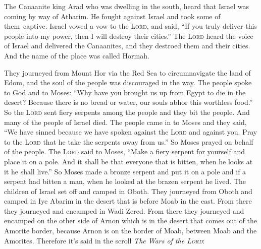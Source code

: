 
\begin{inparaenum}
     The Canaanite king Arad who was dwelling in the south, heard that Israel was coming by way of Atharim. He fought against Israel and took some of them\understood\ captive.%
     Israel vowed a vow to the \textsc{Lord}, and said, ``If you truly deliver this people into my power, then I will destroy their cities.''%
     The \textsc{Lord} heard the voice of Israel and delivered the Canaanites, and they destroed them and their cities. And the name of the place was called Hormah.%
    
     They journeyed from Mount Hor via the Red Sea to circumnavigate the land of Edom, and the soul of the people was discouraged in the way.%
     The people spoke to God and to Moses: ``Why have you brought us up from Egypt to die in the desert? Because there is no bread or water, our souls abhor this worthless food.''%
     So the \textsc{Lord} sent fiery serpents among the people and they bit the people. And many of the people of Israel died.%
     The people came in to Moses and they said, ``We have sinned because we have spoken against the \textsc{Lord} and against you. Pray to the \textsc{Lord} that he take the serpents away from us.'' So Moses prayed on behalf of the people.%
     The \textsc{Lord} said to Moses, ``Make a fiery serpent for yourself and place it on a pole. And it shall be that everyone that is bitten, when he looks at it he shall live.''%
     So Moses made a bronze serpent and put it on a pole and if a serpent had bitten a man, when he looked at the brazen serpent he lived.%
     The children of Israel set off and camped in Oboth.%
     They journeyed from Oboth and camped in Iye Abarim in the desert that is before Moab in the east.%
     From there they journeyed and encamped in Wadi Zered.%
     From there they journeyed and encamped on the other side of Arnon which is in the desert that comes out of the Amorite border, because Arnon is on the border of Moab, between Moab and the Amorites.%
     Therefore it's said in the scroll \textit{The Wars of the \textsc{Lord}}:\smallskip%
    

\end{inparaenum}
